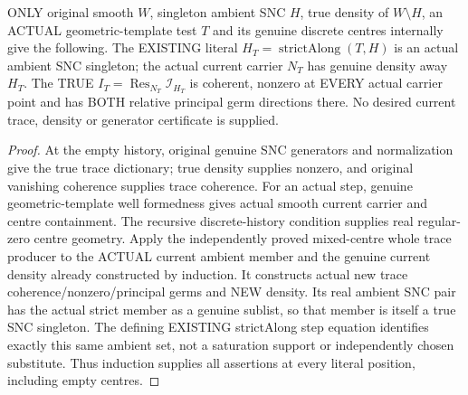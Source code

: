 \begin{theorem}
\label{hir:sharp-actual-finite-ambient-strict-trace-geometry}
\leanok
ONLY original smooth $W$, singleton ambient SNC $H$, true density of
$W\setminus H$, an ACTUAL geometric-template test $T$ and its genuine
discrete centres internally give the following. The EXISTING literal
$H_T=\operatorname{strictAlong}(T,H)$ is an actual ambient SNC singleton;
the actual current carrier $N_T$ has genuine density away $H_T$.
The TRUE $I_T=\operatorname{Res}_{N_T}\mathcal I_{H_T}$ is coherent,
nonzero at EVERY actual carrier point and has BOTH relative principal
germ directions there. No desired current trace, density or generator
certificate is supplied.
\end{theorem}
\begin{proof}
At the empty history, original genuine SNC generators and normalization give
the true trace dictionary; true density supplies nonzero, and original
vanishing coherence supplies trace coherence. For an actual step, genuine
geometric-template well formedness gives actual smooth current carrier and
centre containment. The recursive discrete-history condition supplies real
regular-zero centre geometry. Apply the independently proved mixed-centre
whole trace producer to the ACTUAL current ambient member and the genuine
current density already constructed by induction. It constructs actual
new trace coherence/nonzero/principal germs and NEW density. Its real
ambient SNC pair has the actual strict member as a genuine sublist, so that
member is itself a true SNC singleton. The defining EXISTING strictAlong
step equation identifies exactly this same ambient set, not a saturation
support or independently chosen substitute. Thus induction supplies all
assertions at every literal position, including empty centres.
\end{proof}

